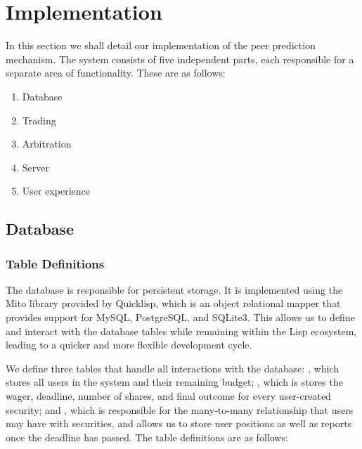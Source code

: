 \section{Implementation}

\label{sec:implementation}

In this section we shall detail our implementation of the peer prediction
mechanism. The system consists of five independent parts, each responsible for
a separate area of functionality. These are as follows:

\begin{enumerate}
	\item Database
	\item Trading
	\item Arbitration
	\item Server
	\item User experience
\end{enumerate}

\subsection{Database}

\subsubsection{Table Definitions}

The database is responsible for persistent storage. It is implemented using the
Mito library provided by Quicklisp, which is an object relational mapper that
provides support for MySQL, PostgreSQL, and SQLite3. This allows us to define
and interact with the database tables while remaining within the Lisp
ecosystem, leading to a quicker and more flexible development cycle.

We define three tables that handle all interactions with the database:
, which stores all users in the system and their remaining budget;
, which is stores the wager, deadline, number of shares, and
final outcome for every user-created security; and , which
is responsible for the many-to-many relationship that users may have with
securities, and allows us to store user positions as well as reports once the
deadline has passed. The table definitions are as follows:

